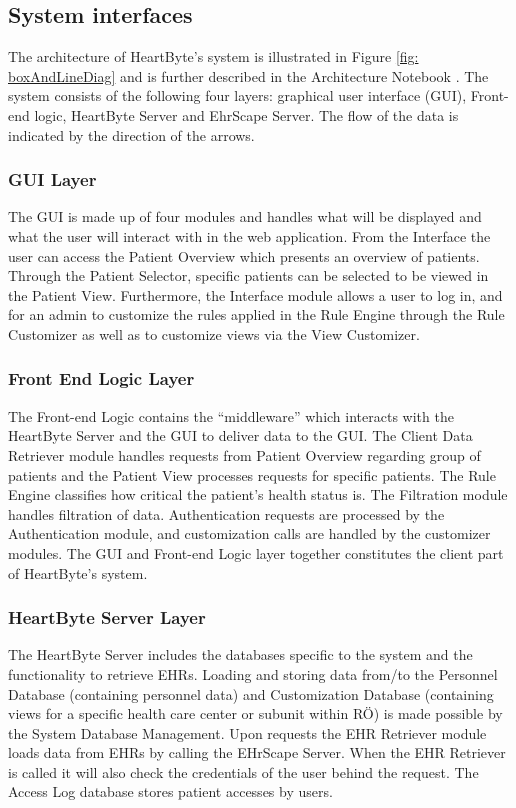 \documentclass{scrreprt}
\begin{document}
\subsection{System interfaces}
The architecture of HeartByte’s system is illustrated in Figure \ref{fig: boxAndLineDiag} and is further described in the Architecture Notebook \cite{architecture}. The system consists of the following four layers: graphical user interface (GUI), Front-end logic, HeartByte Server and EhrScape Server. The flow of the data is indicated by the direction of the arrows. 

\subsubsection{GUI Layer}
The GUI is made up of four modules and handles what will be displayed and what the user will interact with in the web application. From the Interface the user can access the Patient Overview which presents an overview of patients. Through the Patient Selector, specific patients can be selected to be viewed in the Patient View. Furthermore, the Interface module allows a user to log in, and for an admin to customize the rules applied in the Rule Engine through the Rule Customizer as well as to customize views via the View Customizer.

\subsubsection{Front End Logic Layer}
The Front-end Logic contains the “middleware” which interacts with the HeartByte Server and the GUI to deliver data to the GUI. The Client Data Retriever module handles requests from Patient Overview regarding group of patients and the Patient View processes requests for specific patients. The Rule Engine classifies how critical the patient’s health status is. The Filtration module handles filtration of data. Authentication requests are processed by the Authentication module, and customization calls are handled by the customizer modules. The GUI and Front-end Logic layer together constitutes the client part of HeartByte’s system.

\subsubsection{HeartByte Server Layer}
The HeartByte Server includes the databases specific to the system and the functionality to retrieve EHRs. Loading and storing data from/to the Personnel Database (containing personnel data) and Customization Database (containing views for a specific health care center or subunit within RÖ) is made possible by the System Database Management. Upon requests the EHR Retriever module loads data from EHRs by calling the EHrScape Server. When the EHR Retriever is called it will also check the credentials of the user behind the request. The Access Log database stores patient accesses by users.
\end{document}
